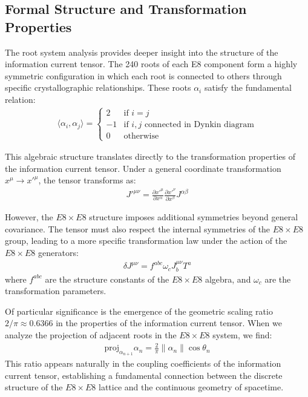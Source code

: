 \documentclass[11pt,english,twoside]{article}
\begin{document}
\subsection{Formal Structure and Transformation Properties}

The root system analysis provides deeper insight into the structure of the information current tensor. The 240 roots of each E8 component form a highly symmetric configuration in which each root is connected to others through specific crystallographic relationships. These roots $\alpha_i$ satisfy the fundamental relation:
\begin{align}
    \langle \alpha_i, \alpha_j \rangle = \begin{cases}
    2 & \text{if } i = j \\
    -1 & \text{if } i,j \text{ connected in Dynkin diagram} \\
    0 & \text{otherwise}
    \end{cases}
\end{align}

This algebraic structure translates directly to the transformation properties of the information current tensor. Under a general coordinate transformation $x^\mu \rightarrow x'^\mu$, the tensor transforms as:
\begin{align}
    J'^{\mu\nu} = \frac{\partial x'^\mu}{\partial x^\alpha}\frac{\partial x'^\nu}{\partial x^\beta}J^{\alpha\beta}
\end{align}

However, the $E8\times E8$ structure imposes additional symmetries beyond general covariance. The tensor must also respect the internal symmetries of the $E8\times E8$ group, leading to a more specific transformation law under the action of the $E8\times E8$ generators:
\begin{align}
    \delta J^{\mu\nu} = f^{abc}\omega_c J_b^{\mu\nu}T^a
\end{align}
where $f^{abc}$ are the structure constants of the $E8\times E8$ algebra, and $\omega_c$ are the transformation parameters.

Of particular significance is the emergence of the geometric scaling ratio $2/\pi \approx 0.6366$ in the properties of the information current tensor. When we analyze the projection of adjacent roots in the $E8\times E8$ system, we find:
\begin{align}
    \text{proj}_{\alpha_{n+1}}\alpha_n = \frac{2}{\pi} \|\alpha_n\| \cos\theta_n
\end{align}
This ratio appears naturally in the coupling coefficients of the information current tensor, establishing a fundamental connection between the discrete structure of the $E8\times E8$ lattice and the continuous geometry of spacetime.
\end{document}
